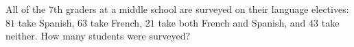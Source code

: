 All of the $7$th graders at a middle school are surveyed on their language electives: $81$ take Spanish, $63$ take French, $21$ take both French and Spanish, and $43$ take neither. How many students were surveyed?
